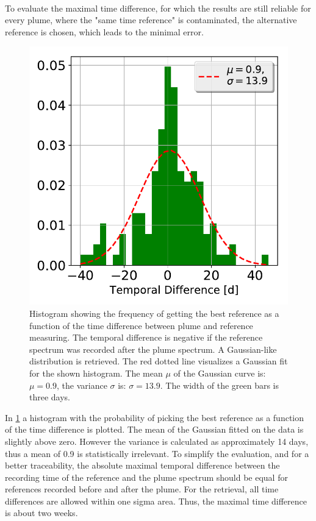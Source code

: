 \\
To evaluate the maximal time difference, for which the results are still reliable for every plume, where the "same time reference" is contaminated, the alternative reference is chosen, which leads to the minimal  error.\\
\begin{figure}
    \centering
    \includegraphics[width=0.6\linewidth]{Bilder/Hist}
    \caption[Histogram showing the frequency of getting the best reference as a function of the time difference between plume and reference measuring.]{Histogram showing the frequency of getting the best reference as a function of the time difference between plume and reference measuring. The temporal difference is negative if the reference spectrum was recorded after the plume spectrum. A Gaussian-like distribution is retrieved. The red dotted line visualizes a Gaussian fit for the shown histogram. The mean $\mu$ of the Gaussian curve is: $\mu = 0.9$, the variance $\sigma$ is: $\sigma = 13.9$. The width of the green bars is three days.}
    \label{fig:Hist}
\end{figure}
%
In \cref{fig:Hist} a histogram with the probability of picking the best reference as a function of the time difference is plotted. The mean of the Gaussian fitted on the data is slightly above zero. However the variance is calculated as approximately 14 days, thus a mean of 0.9 is statistically irrelevant. To simplify the evaluation, and for a better traceability, the absolute maximal temporal difference between the recording time of the reference and the plume spectrum should be equal for references recorded before and after the plume. For the retrieval, all time differences are allowed within one sigma area. Thus, the maximal time difference is about two weeks.\\

